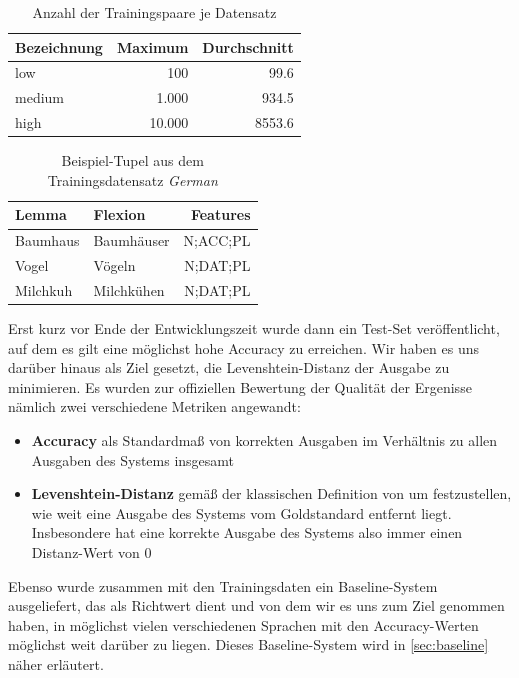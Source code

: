 \documentclass[11pt,a4paper]{article}
\newcommand{\lang}[1]{\textit{#1}}
\begin{document}
\begin{table}[htb]
\centering
\begin{tabular}{lrr}
\toprule
Bezeichnung & Maximum & Durchschnitt\\
\midrule
low & 100 & 99.6\\
medium & 1.000 & 934.5\\
high & 10.000 & 8553.6\\
\bottomrule
\end{tabular}
\caption{Anzahl der Trainingspaare je Datensatz}
\label{fig:training-volumes}
\end{table}

\begin{table}[htb]
\centering
\begin{tabular}{llr}
\toprule
Lemma & Flexion & Features\\
\midrule
Baumhaus & Baumhäuser & N;ACC;PL\\
Vogel & Vögeln & N;DAT;PL\\
Milchkuh & Milchkühen & N;DAT;PL\\
\bottomrule
\end{tabular}
\caption{Beispiel-Tupel aus dem Trainingsdatensatz \lang{German}}
\label{fig:german-declension}
\end{table}

Erst kurz vor Ende der Entwicklungszeit wurde dann ein Test-Set veröffentlicht, auf dem es gilt eine möglichst hohe Accuracy zu erreichen.
Wir haben es uns darüber hinaus als Ziel gesetzt, die Levenshtein-Distanz der Ausgabe zu minimieren. Es wurden zur offiziellen Bewertung der Qualität der Ergenisse nämlich zwei verschiedene Metriken angewandt:
\begin{itemize}
    \item \textbf{Accuracy} als Standardmaß von korrekten Ausgaben im Verhältnis zu allen Ausgaben des Systems insgesamt
    \item \textbf{Levenshtein-Distanz} gemäß der klassischen Definition von \citet{levenshtein:binary66} um festzustellen, wie weit eine Ausgabe des Systems vom Goldstandard entfernt liegt. Insbesondere hat eine korrekte Ausgabe des Systems also immer einen Distanz-Wert von $0$
\end{itemize}
Ebenso wurde zusammen mit den Trainingsdaten ein Baseline-System ausgeliefert, das als Richtwert dient und von dem wir es uns zum Ziel genommen haben, in möglichst vielen verschiedenen Sprachen mit den Accuracy-Werten möglichst weit darüber zu liegen.
Dieses Baseline-System wird in \autoref{sec:baseline} näher erläutert.
\end{document}
